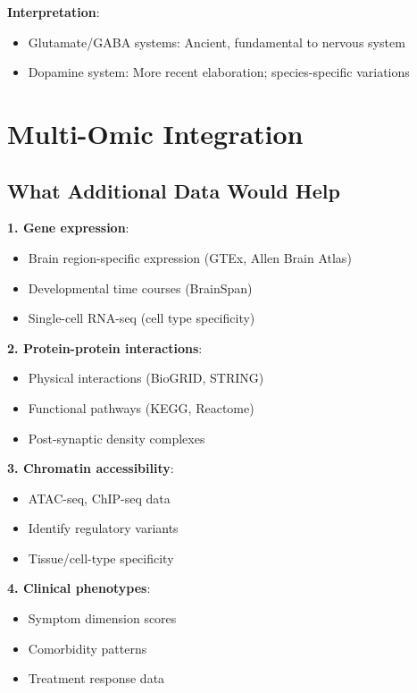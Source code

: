 \documentclass[12pt,letterpaper]{article}
\begin{document}
\textbf{Interpretation}:
\begin{itemize}
    \item Glutamate/GABA systems: Ancient, fundamental to nervous system
    \item Dopamine system: More recent elaboration; species-specific variations
\end{itemize}

\section{Multi-Omic Integration}

\subsection{What Additional Data Would Help}

\textbf{1. Gene expression}:
\begin{itemize}
    \item Brain region-specific expression (GTEx, Allen Brain Atlas)
    \item Developmental time courses (BrainSpan)
    \item Single-cell RNA-seq (cell type specificity)
\end{itemize}

\textbf{2. Protein-protein interactions}:
\begin{itemize}
    \item Physical interactions (BioGRID, STRING)
    \item Functional pathways (KEGG, Reactome)
    \item Post-synaptic density complexes
\end{itemize}

\textbf{3. Chromatin accessibility}:
\begin{itemize}
    \item ATAC-seq, ChIP-seq data
    \item Identify regulatory variants
    \item Tissue/cell-type specificity
\end{itemize}

\textbf{4. Clinical phenotypes}:
\begin{itemize}
    \item Symptom dimension scores
    \item Comorbidity patterns
    \item Treatment response data
\end{itemize}
\end{document}

